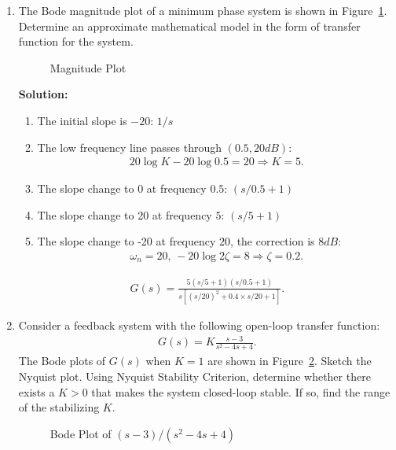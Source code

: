 \documentclass{article}
\newlength\figureheight
\newlength\figurewidth
\newcommand{\tikzdir}[1]{tikz/#1.tikz}
\newcommand{\inputtikz}[1]{}}
\begin{document}
\begin{enumerate}
  \newpage
\item The Bode magnitude plot of a minimum phase system is shown in Figure~\ref{fig:1}. Determine an approximate mathematical model in the form of transfer function for the system.
  \begin{figure}[ht]
    \setlength\figureheight{8cm}
    \setlength\figurewidth{14cm}
    \centering
    \inputtikz{Quiz25}
    \caption{Magnitude Plot\label{fig:1}}
  \end{figure}

  {\bf Solution:}
  \begin{enumerate}
  \item The initial slope is $-20$: $1/s$
  \item The low frequency line passes through $(0.5,20dB)$:
    \begin{align*}
      20\log K - 20 \log 0.5 = 20\Rightarrow K = 5.
    \end{align*}
  \item The slope change to 0 at frequency $0.5$: $(s/0.5+1)$
  \item The slope change to 20 at frequency $5$: $(s/5+1)$
  \item The slope change to -20 at frequency $20$, the correction is $8dB$:
    \begin{align*}
      \omega_n = 20,\,-20\log 2\zeta = 8 \Rightarrow \zeta = 0.2.
    \end{align*}
  \end{enumerate}
\begin{align*}
  G(s) = \frac{5(s/5+1)(s/0.5+1)}{s\left[(s/20)^2+0.4\times s/20+1\right]}.
\end{align*}


  \newpage
\item Consider a feedback system with the following open-loop transfer function:
  \begin{align*}
    G(s) = K\frac{s-3}{s^2-4s+4}.
  \end{align*}
  The Bode plots of $G(s)$ when $K = 1$ are shown in Figure~\ref{fig:2}. Sketch the Nyquist plot. Using Nyquist Stability Criterion, determine whether there exists a $K > 0$ that makes the system closed-loop stable. If so, find the range of the stabilizing $K$.
  \begin{figure}[ht]
    \setlength\figureheight{5cm}
    \setlength\figurewidth{14cm}
    \centering
    \inputtikz{Quiz26}
    \caption{Bode Plot of $(s-3)/(s^2-4s+4)$\label{fig:2}}
  \end{figure}


\end{enumerate}
\end{document}
